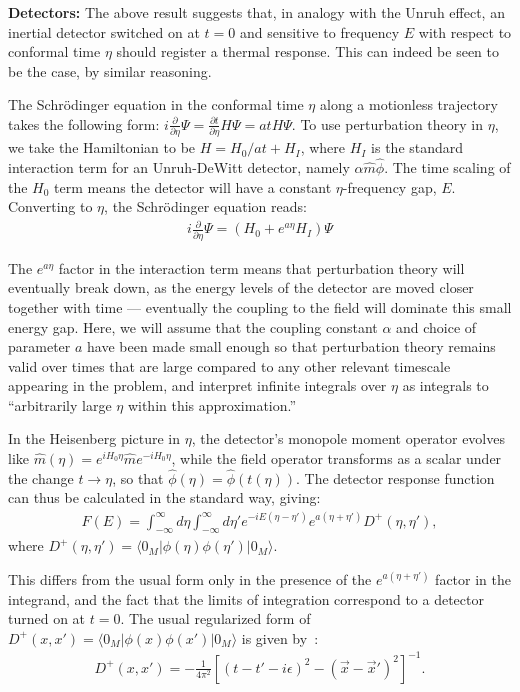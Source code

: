 \documentclass[aps,prl,twocolumn,showpacs]{revtex4}
\begin{document}
\textbf{Detectors:} The above result suggests that, in analogy with the Unruh effect, an inertial detector switched on at $t=0$ and sensitive to frequency $E$ with respect to conformal time $\eta$ should register a thermal response.  This can indeed be seen to be the case, by similar reasoning.

The Schr\"odinger equation in the conformal time $\eta$ along a motionless trajectory takes the following form:  $i \frac{\partial}{\partial \eta} \Psi = \frac{\partial t}{\partial \eta} H \Psi = atH \Psi $.  To use perturbation theory in $\eta$, we take the Hamiltonian to be $H = H_{0}/at + H_{I}$, where $H_{I}$ is the standard interaction term for an Unruh-DeWitt detector, namely $\alpha \hat{m} \hat{\phi}$.  The time scaling of the $H_{0}$ term means the detector will have a constant $\eta$-frequency gap, $E$.  Converting to $\eta$, the Schr\"odinger equation reads:
\begin{eqnarray*}
i \frac{\partial}{\partial \eta} \Psi = \left( H_{0} + e^{a \eta} H_{I}\right) \Psi
\end{eqnarray*}

The $e^{a \eta}$ factor in the interaction term means that perturbation theory will eventually break down, as the energy levels of the detector are moved closer together with time \---- eventually the coupling to the field will dominate this small energy gap.  Here, we will assume that the coupling constant $\alpha$ and choice of parameter $a$ have been made small enough so that perturbation theory remains valid over times that are large compared to any other relevant timescale appearing in the problem, and interpret infinite integrals over $\eta$ as integrals to ``arbitrarily large $\eta$ within this approximation.''

In the Heisenberg picture in $\eta$, the detector's monopole moment operator evolves like $\hat{m}(\eta) = e^{i H_{0} \eta} \hat{m} e^{-i H_{0} \eta}$, while the field operator transforms as a scalar under the change $t \rightarrow \eta$, so that $\hat{\phi}(\eta) = \hat{\phi}(t(\eta))$.  The detector response function can thus be calculated in the standard way, giving:
\begin{eqnarray*}
F(E) = \int_{-\infty}^{\infty} d \eta \int_{- \infty}^{\infty} d \eta' e^{-iE(\eta - \eta')} e^{a(\eta + \eta')} D^{+}(\eta, \eta'), 
\end{eqnarray*}
where $D^{+}(\eta, \eta')= \langle 0_{M} | \phi(\eta) \phi(\eta') |0_{M} \rangle.$

This differs from the usual form only in the presence of the $e^{a(\eta + \eta')}$ factor in the integrand, and the fact that the limits of integration correspond to a detector turned on at $t=0$.  The usual regularized form of $D^{+}(x, x') = \langle 0_{M} | \phi(x) \phi(x') |0_{M} \rangle$ is given by~\cite{birrell1}:
\begin{eqnarray*}
 D^{+}(x, x') = - \frac{1}{4 \pi^2} \left[ (t - t' - i \epsilon)^{2} - (\vec{x} - \vec{x}')^{2} \right]^{-1}.
\end{eqnarray*}
\end{document}
